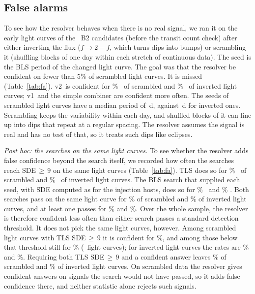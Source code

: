 \documentclass[twocolumn,linenumbers]{aastex701}
\newcommand{\Vone}{v1}
\newcommand{\Vtwo}{v2}
\begin{document}
\subsection{False alarms} \label{sec:fa}

To see how the resolver behaves when there is no real signal, we ran it on the early light curves of the \faScrN\ B2 candidates (before the transit count check) after either inverting the flux ($f \to 2-f$, which turns dips into bumps) or scrambling it (shuffling blocks of one day within each stretch of continuous data). The seed is the BLS period of the changed light curve. The goal was that the resolver be confident on fewer than 5\% of scrambled light curves. It is missed (Table~\ref{tab:fa}). \Vtwo\ is confident for \faScrVtwo\% \faScrVtwoCI\ of scrambled and \faInvVtwo\% \faInvVtwoCI\ of inverted light curves; \Vone\ and the simple combiner are confident more often. The seeds of scrambled light curves have a median period of \faScrSeedMed\,d, against \faInvSeedMed\,d for inverted ones. Scrambling keeps the variability within each day, and shuffled blocks of it can line up into dips that repeat at a regular spacing. The resolver assumes the signal is real and has no test of that, so it treats such dips like eclipses.

\emph{Post hoc: the searches on the same light curves.} To see whether the resolver adds false confidence beyond the search itself, we recorded how often the searches reach SDE\,$\ge$\,9 on the same light curves (Table~\ref{tab:fa}). TLS does so for \ctxScrTls\% \ctxScrTlsCI\ of scrambled and \ctxInvTls\% \ctxInvTlsCI\ of inverted light curves. The BLS search that supplied each seed, with SDE computed as for the injection hosts, does so for \ctxScrAsix\% \ctxScrAsixCI\ and \ctxInvAsix\% \ctxInvAsixCI. Both searches pass on the same light curve for \ctxScrSdeAnd\% of scrambled and \ctxInvSdeAnd\% of inverted light curves, and at least one passes for \ctxScrSdeOr\% and \ctxInvSdeOr\%. Over the whole sample, the resolver is therefore confident less often than either search passes a standard detection threshold. It does not pick the same light curves, however. Among scrambled light curves with TLS SDE\,$\ge$\,9 it is confident for \ctxScrTlsBoth\%, and among those below that threshold still for \ctxScrTlsLow\% (\ctxScrTlsLowN\ light curves); for inverted light curves the rates are \ctxInvTlsBoth\% and \ctxInvTlsLow\%. Requiring both TLS SDE\,$\ge$\,9 and a confident answer leaves \ctxScrTlsJoint\% of scrambled and \ctxInvTlsJoint\% of inverted light curves. On scrambled data the resolver gives confident answers on signals the search would not have passed, so it adds false confidence there, and neither statistic alone rejects such signals.
\end{document}
